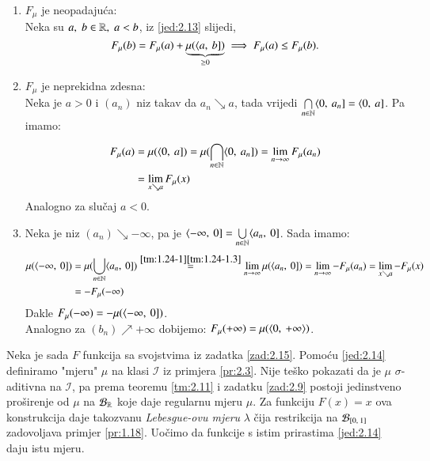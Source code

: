 \begin{rj}[\ref{zad:2.15}]  \label{rj:2.15}
    \quad \\
    \begin{enumerate}[label=\arabic*.]
        \item $F_{\mu}$ je neopadaju\' ca:\\
        Neka su $a, \; b \in \mathbb{R}, \; a < b$, iz \eqref{jed:2.13} slijedi,
        \begin{equation*}
            F_\mu (b) = F_\mu (a) + \underbrace{\mu (\langle {a}, \: {b}])}_{\geq 0} \implies F_\mu (a) \leq F_\mu (b).
        \end{equation*}
        \item $F_\mu$ je neprekidna zdesna:\\
        Neka je $a > 0$ i $(a_n)$ niz takav da $a_n \searrow a$, tada vrijedi $\bigcap\limits_{n \in \mathbb{N}}^{} \langle {0}, \: {a_n}] = \langle {0}, \: {a}]$.
        Pa imamo:
        \begin{equation*}
            \begin{aligned}
                F_\mu (a) &= \mu(\langle {0}, \: {a}]) = \mu (\bigcap\limits_{n \in \mathbb{N}}^{} \langle {0}, \: {a_n}]) = \lim\limits_{n \to \infty} F_\mu (a_n)\\
                &= \lim_{x \searrow a} F_\mu (x)
            \end{aligned}
        \end{equation*}
        Analogno za slu\v caj $a < 0$.
        \item Neka je niz $(a_n) \searrow -\infty$, pa je $\langle {-\infty}, \: {0}] = \bigcup\limits_{n \in \mathbb{N}}^{} \langle {a_n}, \: {0}]$.
        Sada imamo:
        \begin{equation*}
            \begin{aligned}
                \mu (\langle {-\infty}, \: {0}]) &= \mu (\bigcup\limits_{n \in \mathbb{N}}^{} \langle {a_n}, \: {0}]) \overset{\ref{tm:1.24-1} \ref{tm:1.24-1.3}}{=} \lim\limits_{n \to \infty} \mu({\langle {a_n}, \: {0}]}) = \lim\limits_{n \to \infty} - F_\mu (a_n) = \lim\limits_{x \searrow a} - F_\mu (x)\\
                &= - F_\mu (-\infty)
            \end{aligned}
        \end{equation*}
        Dakle $F_\mu (-\infty) = - \mu (\langle {-\infty}, \: {0}])$.\\
        Analogno za $(b_n) \nearrow +\infty$ dobijemo:
        $F_\mu (+\infty) = \mu (\langle {0}, \: {+\infty} \rangle)$.
    \end{enumerate}
\end{rj}

Neka je sada $F$ funkcija sa svojstvima iz zadatka \ref{zad:2.15}.
Pomo\' cu \eqref{jed:2.14} definiramo "mjeru" $\mu$ na klasi $\mathcal{I}$ iz primjera \eqref{pr:2.3}.
Nije te\v sko pokazati da je $\mu$ $\sigma$-aditivna na $\mathcal{I}$, pa prema teoremu \ref{tm:2.11} i zadatku \ref{zad:2.9} postoji jedinstveno pro\v sirenje od $\mu$ na $\mathcal{B}_{\mathbb{R}}$ koje daje regularnu mjeru $\mu$.
Za funkciju $F(x) = x$ ova konstrukcija daje takozvanu \emph{Lebesgue-ovu mjeru} $\lambda$ \v cija restrikcija na $\mathcal{B}_{[{0}, \:{1}]}$ zadovoljava primjer \ref{pr:1.18}.
Uo\v cimo da funkcije s istim prirastima \eqref{jed:2.14} daju istu mjeru.